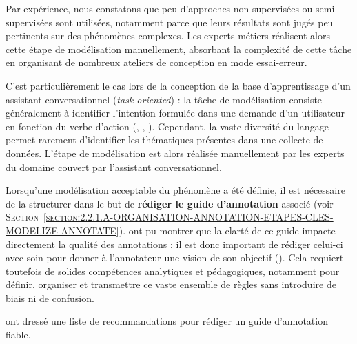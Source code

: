 			\begin{leftBarAuthorOpinion}
				Par expérience, nous constatons que peu d'approches non supervisées ou semi-supervisées sont utilisées, notamment parce que leurs résultats sont jugés peu pertinents sur des phénomènes complexes.
				Les experts métiers réalisent alors cette étape de modélisation manuellement, absorbant la complexité de cette tâche en organisant de nombreux ateliers de conception en mode essai-erreur.
				
				C'est particulièrement le cas lors de la conception de la base d'apprentissage d'un assistant conversationnel (\textit{task-oriented}) : la tâche de modélisation consiste généralement à identifier l'intention formulée dans une demande d'un utilisateur en fonction du verbe d'action (, , ).
				Cependant, la vaste diversité du langage permet rarement d'identifier les thématiques présentes dans une collecte de données.
				L'étape de modélisation est alors réalisée manuellement par les experts du domaine couvert par l'assistant conversationnel.
			\end{leftBarAuthorOpinion}
			
			Lorsqu'une modélisation acceptable du phénomène a été définie, il est nécessaire de la structurer dans le but de \textbf{rédiger le guide d'annotation} associé (voir \textsc{Section~\ref{section:2.2.1.A-ORGANISATION-ANNOTATION-ETAPES-CLES-MODELIZE-ANNOTATE}}).
			\cite{nedellec-etal:2006:annotation-guidelines-machine} ont pu montrer que la clarté de ce guide impacte directement la qualité des annotations : il est donc important de rédiger celui-ci avec soin pour donner à l'annotateur une vision de son objectif (\cite{fort-etal:2009:vers-methodologie-annotation}).
			Cela requiert toutefois de solides compétences analytiques et pédagogiques, notamment pour définir, organiser et transmettre ce vaste ensemble de règles sans introduire de biais ni de confusion.
			\begin{leftBarReminder}
				\cite{dipper-etal:2004:useradaptive-annotation-guidelines} ont dressé une liste de recommandations pour rédiger un guide d'annotation fiable.
			\end{leftBarReminder}
			
